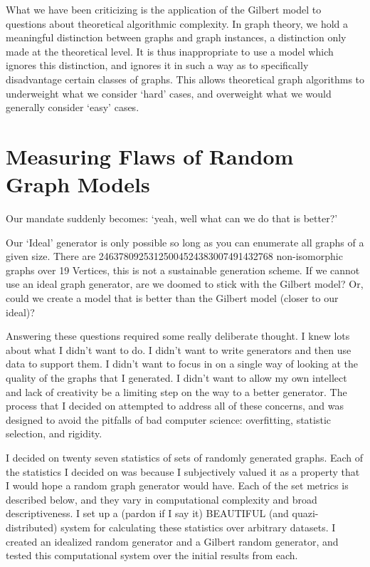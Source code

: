 \documentclass[11pt,a4paper]{report}
\begin{document}
What we have been criticizing is the application of the Gilbert model to questions about theoretical algorithmic complexity.
In graph theory, we hold a meaningful distinction between graphs and graph instances, a distinction only made at the theoretical level.
It is thus inappropriate to use a model which ignores this distinction, and ignores it in such a way as to specifically disadvantage certain classes of graphs.
This allows theoretical graph algorithms to underweight what we consider `hard' cases, and overweight what we would generally consider `easy' cases.

\section{Measuring Flaws of Random Graph Models}

Our mandate suddenly becomes: `yeah, well what can we do that is better?'

Our `Ideal' generator is only possible so long as you can enumerate all graphs of a given size.
There are 24637809253125004524383007491432768 non-isomorphic graphs over 19 Vertices, this is not a sustainable generation scheme.
If we cannot use an ideal graph generator, are we doomed to stick with the Gilbert model?
Or, could we create a model that is better than the Gilbert model (closer to our ideal)?

Answering these questions required some really deliberate thought.
I knew lots about what I didn't want to do.
I didn't want to write generators and then use data to support them.
I didn't want to focus in on a single way of looking at the quality of the graphs that I generated.
I didn't want to allow my own intellect and lack of creativity be a limiting step on the way to a better generator.
The process that I decided on attempted to address all of these concerns, and was designed to avoid the pitfalls of bad computer science: overfitting, statistic selection, and rigidity.

I decided on twenty seven statistics of sets of randomly generated graphs.
Each of the statistics I decided on was because I subjectively valued it as a property that I would hope a random graph generator would have.
Each of the set metrics is described below, and they vary in computational complexity and broad descriptiveness. 
I set up a (pardon if I say it) BEAUTIFUL (and quazi-distributed) system for calculating these statistics over arbitrary datasets.
I created an idealized random generator and a Gilbert random generator, and tested this computational system over the initial results from each.
\end{document}
